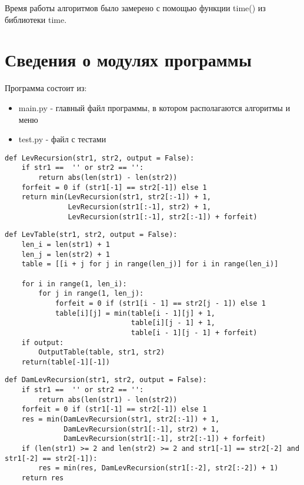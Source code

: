 \documentclass[12pt]{report}
\begin{document}
Время работы алгоритмов было замерено с помощью функции time() из библиотеки time.

\section{Сведения о модулях программы}
Программа состоит из:
\begin{itemize}
	\item main.py - главный файл программы, в котором располагаются алгоритмы и меню
	\item test.py - файл с тестами 
\end{itemize}

\begin{lstlisting}[label=some-code,caption=Функция нахождения расстояния Левенштейна рекурсивно]
def LevRecursion(str1, str2, output = False):
    if str1 ==  '' or str2 == '':
        return abs(len(str1) - len(str2))
    forfeit = 0 if (str1[-1] == str2[-1]) else 1
    return min(LevRecursion(str1, str2[:-1]) + 1,
               LevRecursion(str1[:-1], str2) + 1,
               LevRecursion(str1[:-1], str2[:-1]) + forfeit)
\end{lstlisting}

\begin{lstlisting}[label=some-code,caption=Функция нахождения расстояния Левенштейна матрично]
def LevTable(str1, str2, output = False):
    len_i = len(str1) + 1
    len_j = len(str2) + 1
    table = [[i + j for j in range(len_j)] for i in range(len_i)]
    
    for i in range(1, len_i):
        for j in range(1, len_j):
            forfeit = 0 if (str1[i - 1] == str2[j - 1]) else 1
            table[i][j] = min(table[i - 1][j] + 1,
                              table[i][j - 1] + 1,
                              table[i - 1][j - 1] + forfeit)
    if output:        
        OutputTable(table, str1, str2)
    return(table[-1][-1])
\end{lstlisting}

\begin{lstlisting}[label=some-code,caption=Функция нахождения расстояния Дамерау-Левенштейна рекурсивно]
def DamLevRecursion(str1, str2, output = False):
    if str1 ==  '' or str2 == '':
        return abs(len(str1) - len(str2))
    forfeit = 0 if (str1[-1] == str2[-1]) else 1
    res = min(DamLevRecursion(str1, str2[:-1]) + 1,
              DamLevRecursion(str1[:-1], str2) + 1,
              DamLevRecursion(str1[:-1], str2[:-1]) + forfeit)
    if (len(str1) >= 2 and len(str2) >= 2 and str1[-1] == str2[-2] and str1[-2] == str2[-1]):
        res = min(res, DamLevRecursion(str1[:-2], str2[:-2]) + 1)
    return res 
\end{lstlisting}
\end{document}
